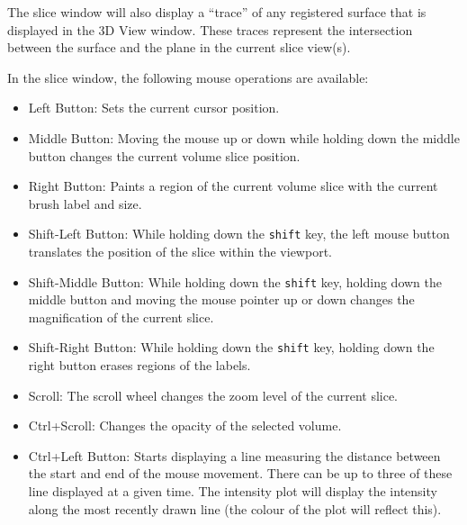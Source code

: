 \documentclass[11pt,letterpaper]{article}
\newcommand{\ident}[1]{{\tt #1}}
\begin{document}
The slice window will also display a ``trace'' of any registered
surface that is displayed in the 3D View window. These traces
represent the intersection between the surface and the plane in the
current slice view(s).

In the slice window, the following mouse operations are available:

\begin{itemize}
\item Left Button: Sets the current cursor position.
\item Middle Button: Moving the mouse up or down while holding down
  the middle button changes the current volume slice position.
\item Right Button: Paints a region of the current volume slice with the
current brush label and size.
\item Shift-Left Button: While holding down the \ident{shift} key, the
  left mouse button translates the position of the slice within the
  viewport.
\item Shift-Middle Button: While holding down the \ident{shift} key,
  holding down the middle button and moving the mouse pointer up or down
  changes the magnification of the current slice.
\item Shift-Right Button: While holding down the \ident{shift} key,
  holding down the right button erases regions of the labels.
\item Scroll: The scroll wheel changes the zoom level of the current slice.
\item Ctrl+Scroll: Changes the opacity of the selected volume.
\item Ctrl+Left Button: Starts displaying a line measuring the
 distance between the start and end of the mouse movement. There can be up to three of these line displayed at a given time. The intensity plot will display the intensity along the most recently drawn line (the colour of the plot will reflect this).
\end{itemize}
\end{document}

